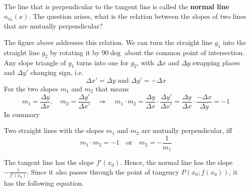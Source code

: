 \documentclass[12pt,eng]{skript_ogg}
\begin{document}
The line that is perpendicular to the tangent line is called the \textbf{normal line} $n_{x_0}(x)$. The question arises, what is the relation between the slopes of two lines that are mutually perpendicular?
\begin{center}
\end{center}
The figure above addresses this relation. We can turn the straight line $g_1$ into the straight line $g_2$ by rotating it by $90\deg$ about the common point of intersection. Any slope triangle of $g_1$ turns into one for $g_2$, with $\Delta x$ and $\Delta y$ swapping places and $\Delta y'$ changing sign, i.e.
\[\Delta x'=\Delta y\mbox{ and }\Delta y'=-\Delta x\]
For the two slopes $m_1$ and $m_2$ that means
\[m_1=\frac{\Delta y}{\Delta x},\quad m_2=\frac{\Delta y'}{\Delta x'}\quad\Rightarrow\quad m_1\cdot m_2=\frac{\Delta y}{\Delta x}\cdot\frac{\Delta y'}{\Delta x'}=\frac{\Delta y}{\Delta x}\cdot\frac{-\Delta x}{\Delta y}=-1\]
In summary

\begin{satz}
Two straight lines with the slopes $m_1$ and $m_2$ are mutually perpendicular, iff
\[m_1\cdot m_2=-1\quad\mbox{or}\quad m_2=-\frac{1}{m_1}\]
\end{satz}

The tangent line has the slope $f'(x_0)$. Hence, the normal line has the slope $-\frac{1}{f'(x_0)}$. Since it also passes through the point of tangency $P(x_0;f(x_0))$, it has the following equation.
\end{document}
